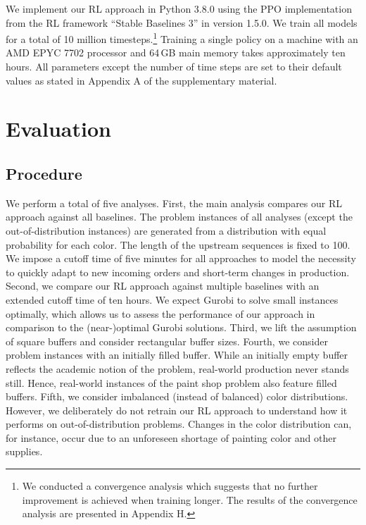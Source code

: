 \documentclass[11pt]{elsarticle}
\begin{document}
We implement our RL approach in Python 3.8.0 using the PPO implementation from the RL framework ``Stable Baselines 3'' \citep{stable-baselines3} in version 1.5.0. We train all models for a total of 10 million timesteps.\footnote{We conducted a convergence analysis which suggests that no further improvement is achieved when training longer. The results of the convergence analysis are presented in Appendix H.} Training a single policy on a machine with an AMD EPYC 7702 processor and 64\,GB main memory takes approximately ten hours. 
All parameters except the number of time steps are set to their default values as stated in Appendix A of the supplementary material. 


\section{Evaluation}
\label{section-Evaluation}

\subsection{Procedure}

We perform a total of five analyses. First, the main analysis compares our RL approach against all baselines. The problem instances of all analyses (except the out-of-distribution instances) are generated from a distribution with equal probability for each color. The length of the upstream sequences is fixed to 100. We impose a cutoff time of five minutes for all approaches to model the necessity to quickly adapt to new incoming orders and short-term changes in production. Second, we compare our RL approach against multiple baselines with an extended cutoff time of ten hours. We expect Gurobi to solve small instances optimally, which allows us to assess the performance of our approach in comparison to the (near-)optimal Gurobi solutions. Third, we lift the assumption of square buffers and consider rectangular buffer sizes. Fourth, we consider problem instances with an initially filled buffer. While an initially empty buffer reflects the academic notion of the problem, real-world production never stands still. Hence, real-world instances of the paint shop problem also feature filled buffers. Fifth, we consider imbalanced (instead of balanced) color distributions. However, we deliberately do not retrain our RL approach to understand how it performs on out-of-distribution problems. Changes in the color distribution can, for instance, occur due to an unforeseen shortage of painting color and other supplies.
\end{document}
